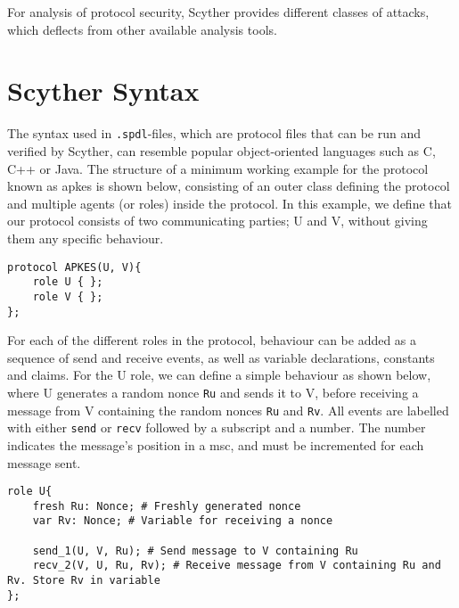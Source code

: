 



For analysis of protocol security, Scyther provides different classes of attacks, which deflects from other available analysis tools.


\section{Scyther Syntax}


The syntax used in \verb!.spdl!-files, which are protocol files that can be run and verified by Scyther, can resemble popular object-oriented languages such as C, C++ or Java. The structure of a minimum working example for the protocol known as \gls{apkes} is shown below, consisting of an outer class defining the protocol and multiple agents (or roles) inside the protocol. In this example, we define that our protocol consists of two communicating parties; U and V, without giving them any specific behaviour.\newline

\begin{lstlisting}
protocol APKES(U, V){
	role U { };
	role V { };  
};
\end{lstlisting}

For each of the different roles in the protocol, behaviour can be added as a sequence of send and receive events, as well as variable declarations, constants and claims. For the U role, we can define a simple behaviour as shown below, where U generates a random nonce \texttt{Ru} and sends it to V, before receiving a message from V containing the random nonces \texttt{Ru} and \texttt{Rv}. All events are labelled with either \texttt{send} or \texttt{recv} followed by a subscript and a number. The number indicates the message's position in a \gls{msc}, and must be incremented for each message sent.\newline

\begin{lstlisting}
role U{
	fresh Ru: Nonce; # Freshly generated nonce
	var Rv: Nonce; # Variable for receiving a nonce
	
	send_1(U, V, Ru); # Send message to V containing Ru
	recv_2(V, U, Ru, Rv); # Receive message from V containing Ru and Rv. Store Rv in variable
};
\end{lstlisting}

